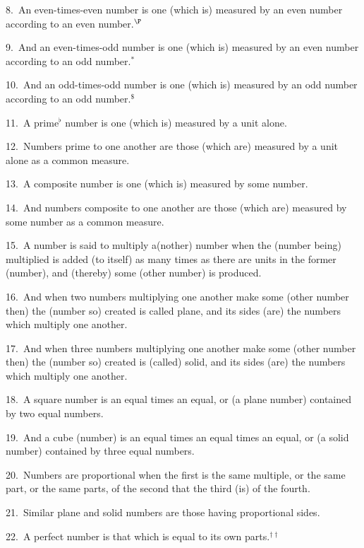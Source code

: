 \begin{Parallel}{}{}
{8.~An even-times-even number is one (which is) measured by an
even number according to an even number.$^\P$

9.~And an even-times-odd number is one (which is) measured by an
even number according to an odd number.$^\ast$

10.~And an odd-times-odd number is one (which is) measured by an
odd number according to an odd number.$^\$$

11.~A prime$^\flat$  number is one (which is) measured by a unit alone.

12.~Numbers prime to one another are those (which are) measured by a unit
alone as a common measure.

13.~A composite number is one (which is) measured by some number.

14.~And numbers composite to one another are those (which are) measured
by some number as a common measure.

15.~A number is said to multiply a(nother) number when the (number being) multiplied is added (to itself) as many times as there are units
 in the former (number), and (thereby) some (other number) is produced.
 
16.~And when two numbers multiplying one another make some
(other number then) the (number so) created  is called plane, and its sides (are) the numbers
which multiply one another.

17.~And when three numbers multiplying one another make some (other number
then) the (number so) created is (called) solid, and its sides (are) the numbers which multiply
one another.

18.~A square number is an equal times an equal, or (a plane number)
contained by two equal numbers.

19.~And a cube (number) is an equal times an equal times an equal,
or (a solid number) contained by three equal numbers.

20.~Numbers are proportional when the first is the same multiple, or
the same part, or the same parts,
of the second that the third (is) of the fourth.

21.~Similar plane and solid numbers are those having proportional
sides.

22.~A perfect number is that which is equal to its own parts.$^{\dag\dag}$}
\end{Parallel}

